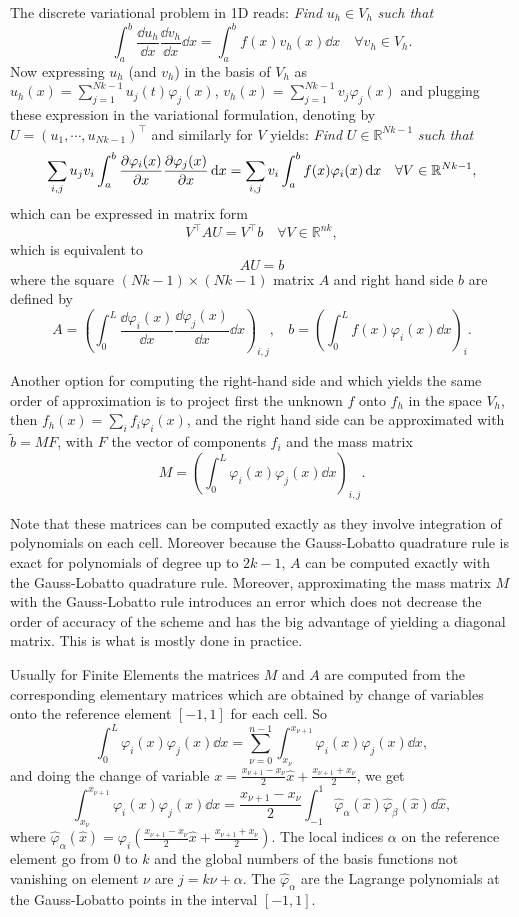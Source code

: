 The discrete variational problem in 1D  reads: 
  \textit{Find } $u_h\in V_h$ \textit{such that} 
$$ \int_a^b \frac{\dd u_h}{\dd x}\frac{\dd v_h}{\dd x} \dd x =  \int_a^b f(x) v_h(x) \dd x\quad\forall v_h\in V_h. $$
Now expressing $u_h$ (and $v_h$) in the basis of $V_h$ as $u_h(x)=\sum_{j=1}^{Nk-1} u_j(t) \varphi_j(x)$,
$v_h(x)=\sum_{j=1}^{Nk-1} v_j \varphi_j(x)$ and plugging these expression in the variational formulation, denoting by
$U=(u_1,\cdots,u_{Nk-1})^\top$ and similarly for $V$
 yields:
  \textit{Find } $U\in \mathbb{R}^{Nk-1}$ \textit{such that}
 \begin{multline*}
 \sum_{i,j} u_jv_i\int_a^b \frac{\partial \varphi_i(x)}{\partial x}\frac{\partial \varphi_j(x)}{\partial x} \,{\rm d} x =
  \sum_{i,j}v_i \int_a^b f(x)\varphi_i(x)\,{\rm d} x 
 \quad\forall V\in \mathbb{R}^{Nk-1}, 
 \end{multline*}
 which can be expressed in matrix form
 $$ V^\top AU= V^\top b \quad\forall V\in \mathbb{R}^{nk},$$
 which is equivalent to
  $$ AU=b$$
 where the square $(Nk-1)\times (Nk-1)$ matrix $A$ and right hand side $b$ are  defined by
 $$A=(  \int_0^L \frac{\dd \varphi_i(x)}{\dd x} \frac{\dd \varphi_j(x)}{\dd x}\dd x)_{i,j},~~~~
b=( \int_0^L f(x)\varphi_i(x)\dd x  )_i .$$

Another option for computing the right-hand side and which yields the same order of approximation is to project first the unknown $f$ onto $f_h$ in the space $V_h$, then $f_h(x)=\sum_i f_i \varphi_i(x)$,
and the right hand side can be approximated with $\tilde{b}= M F$, with $F$ the vector of components $f_i$ and the mass matrix 
$$M= ( \int_0^L \varphi_i(x)\varphi_j(x)\dd x  )_{i,j}.$$ 

 Note that these matrices can be computed exactly as they involve integration of polynomials on each cell. Moreover because the Gauss-Lobatto quadrature rule is exact for polynomials of degree up to $2k-1$,  $A$  can be computed exactly with the Gauss-Lobatto quadrature rule. Moreover, approximating the mass matrix $M$ with the Gauss-Lobatto rule introduces an error which does not decrease the order of accuracy of the scheme \cite{cohen2001} and has the big advantage of yielding a diagonal matrix. This is what is mostly done in practice.

Usually for  Finite Elements the matrices
 $M$ and $A$ are computed from the corresponding elementary matrices which are obtained by change of variables onto the reference element $[-1,1]$ for each cell.
So
$$\int_0^L \varphi_i(x)\varphi_j(x)\dd x = \sum_{\nu=0}^{n-1} \int_{x_\nu}^{x_{\nu+1}} \varphi_i(x)\varphi_j(x)\dd x ,$$
and doing the change of  variable $x=\frac{x_{\nu+1}-x_\nu}{2}\hat{x} + \frac{x_{\nu+1}+x_\nu}{2}$, we get
$$ \int_{x_\nu}^{x_{\nu+1}} \varphi_i(x)\varphi_j(x)\dd x = \frac{x_{\nu+1}-x_\nu}{2}\int_{-1}^1 
 \hat{\varphi}_\alpha(\hat{x})\hat{\varphi}_\beta(\hat{x})\dd \hat{x},$$
 where $ \hat{\varphi}_\alpha(\hat{x}) = \varphi_i(\frac{x_{\nu+1}-x_\nu}{2}\hat{x} +\frac{x_{\nu+1}+x_\nu}{2})$. The local indices $\alpha$ on the reference element go from 0 to $k$ and the global numbers of the basis functions not vanishing on
 element $\nu$ are $j=k\nu+\alpha$.
 The $\hat{\varphi}_\alpha$
 are the  Lagrange polynomials at the Gauss-Lobatto points in the interval $[-1,1]$.

